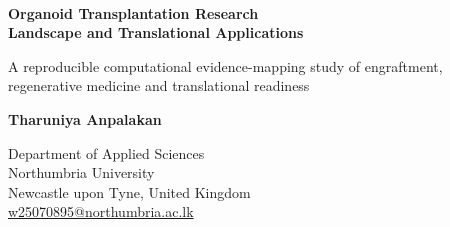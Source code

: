 \documentclass[11pt,a4paper]{article}
\begin{document}
\begin{titlepage}
  \thispagestyle{empty}
  \vspace*{22mm}
  \noindent{\color{teal}\rule{\textwidth}{2.2pt}}\\[16mm]
  \begin{center}
    {\fontsize{24}{30}\selectfont\bfseries\color{navy}
    Organoid Transplantation Research\\[1.5mm]
    Landscape and Translational Applications\par}
  \end{center}

  \vspace{12mm}
  \begin{center}
    \begin{minipage}{0.82\textwidth}
      \fontsize{14}{20}\selectfont\color{textgray}
      A reproducible computational evidence-mapping study of engraftment, regenerative medicine and translational readiness
    \end{minipage}
  \end{center}

  \vspace{28mm}
  \begin{center}
    {\large\bfseries Tharuniya Anpalakan\par}
    \vspace{5mm}
    {\normalsize
    Department of Applied Sciences\\
    Northumbria University\\
    Newcastle upon Tyne, United Kingdom\\[3mm]
    \href{mailto:w25070895@northumbria.ac.lk}{w25070895@northumbria.ac.lk}\par}
  \end{center}

  \vfill
  \noindent{\color{teal}\rule{\textwidth}{2.2pt}}
\end{titlepage}

\end{document}
